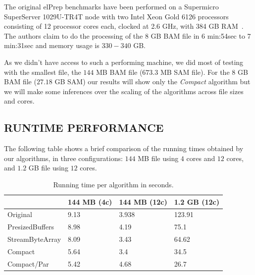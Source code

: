 \documentclass[a4paper,twoside]{article}
\begin{document}

The original elPrep benchmarks have been performed on a Supermicro SuperServer 1029U-TR4T node with two
Intel Xeon Gold 6126 processors consisting of 12 processor cores each, clocked at 2.6 GHz, with 384 GB RAM~\cite{costanza:2019}.
The authors claim to do the processing of the 8 GB BAM file in 6 min:54sec to 7 min:31sec and memory usage is $330-340$ GB\@.

As we didn't have access to such a performing machine, we did most of testing with the smallest file, the $144$ MB BAM file ($673.3$ MB SAM file). For the $8$ GB BAM file ($27.18$ GB SAM) our results will show only the {\textit{Compact} } algorithm but we will make some inferences over the scaling of the algorithms across file sizes and cores.





\subsection{\uppercase{Runtime performance}}
\label{subsec:runtimeperf}

The following table shows a brief comparison of the running times obtained by our algorithms, in three configurations: $144$ MB file using $4$ cores and $12$ cores, and $1.2$ GB file using $12$ cores. 

\begin{table}[h]
	  \caption{Running time per algorithm in seconds.}\centering
	 
\begin{tabular}{|C{2.4cm}|C{1.2cm}|C{1.2cm}|C{1.2cm}|}
\hline
						& 144 MB (4c)	& 144 MB (12c)		& 1.2 GB (12c)	\\ \hline
Original				& 9.13 			& 3.938 			& 123.91 		\\ \hline
PresizedBuffers			& 8.98 			& 4.19 				& 75.1 			\\ \hline
StreamByteArray			& 8.09 			& 3.43 				& 64.62 		\\ \hline
Compact 				& 5.64 			& 3.4 	 			& 34.5			\\ \hline
Compact/Par 			& 5.42		    & 4.68				& 26.7 			\\ \hline
\end{tabular}
\end{table}
\end{document}
